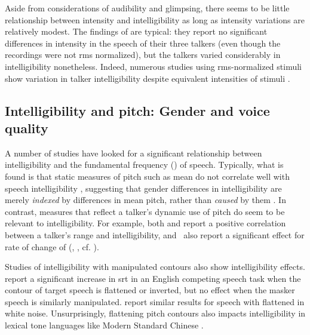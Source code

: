 Aside from considerations of audibility and glimpsing, there seems to be little relationship between intensity and intelligibility as long as intensity variations are relatively modest.  The findings of \citet{BondMoore1994} are typical: they report no significant differences in intensity in the speech of their three talkers (even though the recordings were not \ac{rms} normalized), but the talkers varied considerably in intelligibility nonetheless.  Indeed, numerous studies using \ac{rms}-normalized stimuli show variation in talker intelligibility despite equivalent intensities of stimuli \citep[is one example]{McCloyEtAl2013}.

\subsection[Intelligibility and pitch]{Intelligibility and pitch: Gender and voice quality\label{sec:IntelPitch}}
A number of studies have looked for a significant relationship between intelligibility and the fundamental frequency (\fo) of speech.  Typically, what is found is that static measures of pitch such as mean \fo{} do not correlate well with speech intelligibility \citep[\eg,][]{PichenyEtAl1986, BradlowEtAl1996, HazanMarkham2004, LuCooke2009}, suggesting that gender differences in intelligibility are merely {\em indexed} by differences in mean pitch, rather than {\em caused} by them \citep[cf. discussion in][]{BradlowEtAl1996}.  In contrast, measures that reflect a talker’s dynamic use of pitch do seem to be relevant to intelligibility.  For example, both \citet{BradlowEtAl1996} and \citet{McCloyEtAl2013} report a positive correlation between a talker’s \fo{} range and intelligibility, and \citeauthor{McCloyEtAl2013}\ also report a significant effect for rate of change of \fo{} (\aka, , cf. \citealt{GauthierEtAl2007b, GauthierEtAl2007a, GauthierEtAl2009}). %

Studies of intelligibility with manipulated \fo{} contours also show intelligibility effects.  \citet{BinnsCulling2007} report a significant increase in \ac{srt} in an English competing speech task when the \fo{} contour of target speech is flattened or inverted, but no effect when the masker speech is similarly manipulated.  \citet{WatsonSchlauch2008} report similar results for speech with flattened \fo{} in white noise.  Unsurprisingly, flattening pitch contours also impacts intelligibility in lexical tone languages like Modern Standard Chinese \citep{PatelEtAl2010}.

